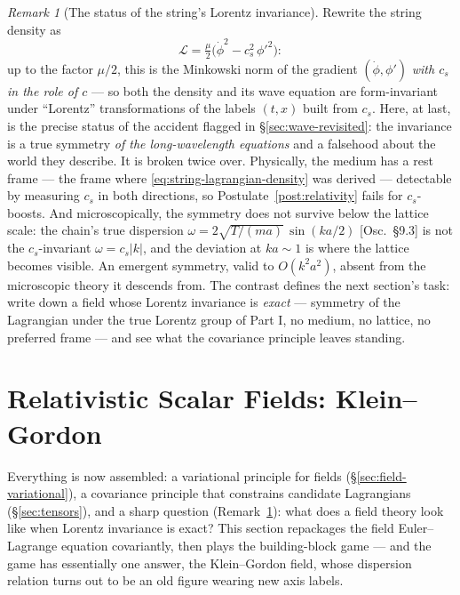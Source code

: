 \documentclass[11pt]{article}
\theoremstyle{plain}
\theoremstyle{definition}
\theoremstyle{remark}
\newtheorem{remark}[theorem]{Remark}
\begin{document}
\begin{remark}[The status of the string's Lorentz invariance]
\label{rem:string-invariance-closed}
Rewrite the string density as
\begin{equation}
  \mathcal L
  = \tfrac{\mu}{2}\bigl(\dot\phi^2 - c_s^2\,\phi'^2\bigr) :
\end{equation}
up to the factor $\mu/2$, this is the Minkowski norm of the gradient
$(\dot\phi, \phi')$ \emph{with $c_s$ in the role of $c$} --- so both
the density and its wave equation are form-invariant under
``Lorentz'' transformations of the labels $(t, x)$ built from $c_s$.
Here, at last, is the precise status of the accident flagged in
\S\ref{sec:wave-revisited}: the invariance is a true symmetry \emph{of
the long-wavelength equations} and a falsehood about the world they
describe. It is broken twice over. Physically, the medium has a rest
frame --- the frame where \eqref{eq:string-lagrangian-density} was
derived --- detectable by measuring $c_s$ in both directions, so
Postulate~\ref{post:relativity} fails for $c_s$-boosts. And
microscopically, the symmetry does not survive below the lattice
scale: the chain's true dispersion
$\omega = 2\sqrt{T/(ma)}\,\sin(ka/2)$ [Osc.\ \S9.3] is not the
$c_s$-invariant $\omega = c_s|k|$, and the deviation at $ka \sim 1$
is where the lattice becomes visible. An emergent symmetry, valid to
$O(k^2 a^2)$, absent from the microscopic theory it descends from.
The contrast defines the next section's task: write down a field
whose Lorentz invariance is \emph{exact} --- symmetry of the
Lagrangian under the true Lorentz group of Part I, no medium, no
lattice, no preferred frame --- and see what the covariance principle
leaves standing.
\end{remark}

\section{Relativistic Scalar Fields: Klein--Gordon}
\label{sec:klein-gordon}

Everything is now assembled: a variational principle for fields
(\S\ref{sec:field-variational}), a covariance principle that constrains
candidate Lagrangians (\S\ref{sec:tensors}), and a sharp question
(Remark~\ref{rem:string-invariance-closed}): what does a field theory
look like when Lorentz invariance is exact? This section repackages
the field Euler--Lagrange equation covariantly, then plays the
building-block game --- and the game has essentially one answer, the
Klein--Gordon field, whose dispersion relation turns out to be an old
figure wearing new axis labels.
\end{document}
